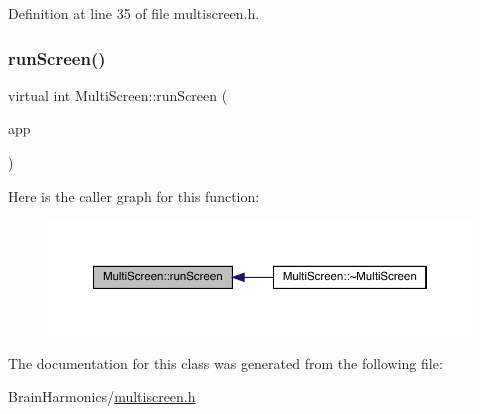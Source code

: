 Definition at line 35 of file multiscreen.\+h.

\mbox{\label{class_multi_screen_a76ec369d025ed4dafdf81fdf5100937b}} 
\subsubsection{\texorpdfstring{run\+Screen()}{runScreen()}}
{\footnotesize\ttfamily virtual int Multi\+Screen\+::run\+Screen (\begin{DoxyParamCaption}\item[{sf\+::\+Render\+Window \&}]{app }\end{DoxyParamCaption})\hspace{0.3cm}{\ttfamily [pure virtual]}}

Here is the caller graph for this function\+:\nopagebreak
\begin{figure}[H]
\begin{center}
\leavevmode
\includegraphics[width=350pt]{class_multi_screen_a76ec369d025ed4dafdf81fdf5100937b_icgraph}
\end{center}
\end{figure}


The documentation for this class was generated from the following file\+:\begin{DoxyCompactItemize}
\item 
Brain\+Harmonics/\hyperlink{multiscreen_8h}{multiscreen.\+h}\end{DoxyCompactItemize}
